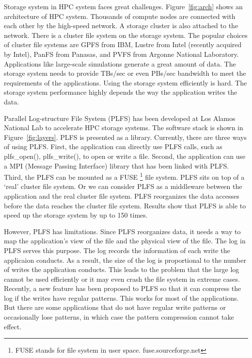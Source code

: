 \documentclass{acm_proc_article-sp}
\begin{document}
Storage system in HPC system faces great challenges.
Figure~\ref{fig:arch} shows an architecture of
HPC system. Thousands of compute nodes are connected
with each other by the high-speed network. A storage
cluster is also attached to the network. There is
a cluster file system on the storage system. The popular
choices of cluster file systems are GPFS from IBM,
Lustre from Intel (recently acquired by Intel),
PanFS from Panasas, and PVFS from Argonne 
National Laboratory. Applications like large-scale
simulations generate a great amount of data. The storage
system needs to provide TBs/sec or even PBs/sec
bandwidth to meet the requirements of the applications.
Using the storage system efficiently is hard. The
storage system performance highly depends the way the
application writes the data.

Parallel Log-structure File System (PLFS) \cite{bent2009plfs}
has been developed
at Los Alamos National Lab to accelerate HPC storage
systems. The software stack is shown in Figure~\ref{fig:layers}.
PLFS is presented as a library. Currently, there
are three ways of using PLFS. First, the application
can directly use PLFS calls, such as plfs\_open(),
plfs\_write(), to open or write a file. 
Second, the application can use a MPI (Message Passing
Interface) library that has been linked with PLFS. 
Third, the PLFS can be mounted as a FUSE 
\footnote{FUSE stands for file system in user space. fuse.sourceforge.net}
file system.
PLFS sits on top of a `real' cluster file system.
Or we can consider PLFS as a middleware between
the application and the real cluster file system.
PLFS reorganizes the data accesses before the
data reaches the cluster file system. 
Results show that PLFS is able to speed up
the storage system by up to 150 times. 

However, PLFS has limitations. Since PLFS reorganizes
data, it needs a way to map the application's view
of the file and the physical view of the file. 
The log in PLFS serves this purpose. The log
records the information of each write the applicaion
conducts. As a result, the size of the log
is proportional to the number of writes the
application conducts. This leads to the problem
that the large log cannot be used efficiently
or it may even crash the file system in extreme
cases. Recently, a new feature has been proposed
to PLFS so that it can compress the log if the 
writes have regular patterns. This works
for most of the applications. But there are
some applications that do not have regular 
write patterns or occasionally lose patterns,
in which case the pattern compression cannot
take effect. 
\end{document}
